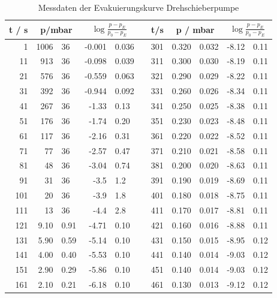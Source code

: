 \begin{table}[H]
\label{tab:10}
\centering
\caption{Messdaten der Evakuierungskurve Drehschieberpumpe}
\begin{tabular}{|r|r@{\,$\pm$\,}l|r@{\,$\pm$\,}l|p{0.5cm}|r|r@{\,$\pm$\,}l|r@{\,$\pm$\,}l|}
\hline
t / s & \multicolumn{2}{c|}{p/\unit{\milli\bar}} & \multicolumn{2}{c|}{$\log{\frac{p-p_E}{p_0-p_E}}$} & & t/s & \multicolumn{2}{c|}{p / \unit{\milli\bar}} & \multicolumn{2}{c|}{$\log{\frac{p-p_E}{p_0-p_E}}$} \\
\hline
1   & 1006   & 36    & -0.001 & 0.036 & & 301 & 0.320  & 0.032 & -8.12  & 0.11  \\
11  & 913    & 36    & -0.098 & 0.039 & & 311 & 0.300  & 0.030 & -8.19  & 0.11  \\
21  & 576    & 36    & -0.559 & 0.063 & & 321 & 0.290  & 0.029 & -8.22  & 0.11  \\
31  & 392    & 36    & -0.944 & 0.092 & & 331 & 0.260  & 0.026 & -8.34  & 0.11  \\
41  & 267    & 36    & -1.33  & 0.13  & & 341 & 0.250  & 0.025 & -8.38  & 0.11  \\
51  & 176    & 36    & -1.74  & 0.20  & & 351 & 0.230  & 0.023 & -8.48  & 0.11  \\
61  & 117    & 36    & -2.16  & 0.31  & & 361 & 0.220  & 0.022 & -8.52  & 0.11  \\
71  & 77     & 36    & -2.57  & 0.47  & & 371 & 0.210  & 0.021 & -8.58  & 0.11  \\
81  & 48     & 36    & -3.04  & 0.74  & & 381 & 0.200  & 0.020 & -8.63  & 0.11  \\
91  & 31     & 36    & -3.5   & 1.2   & & 391 & 0.190  & 0.019 & -8.69  & 0.11  \\
101 & 20     & 36    & -3.9   & 1.8   & & 401 & 0.180  & 0.018 & -8.75  & 0.11  \\
111 & 13     & 36    & -4.4   & 2.8   & & 411 & 0.170  & 0.017 & -8.81  & 0.11  \\
121 & 9.10   & 0.91  & -4.71  & 0.10  & & 421 & 0.160  & 0.016 & -8.88  & 0.11  \\
131 & 5.90   & 0.59  & -5.14  & 0.10  & & 431 & 0.150  & 0.015 & -8.95  & 0.12  \\
141 & 4.00   & 0.40  & -5.53  & 0.10  & & 441 & 0.140  & 0.014 & -9.03  & 0.12  \\
151 & 2.90   & 0.29  & -5.86  & 0.10  & & 451 & 0.140  & 0.014 & -9.03  & 0.12  \\
161 & 2.10   & 0.21  & -6.18  & 0.10  & & 461 & 0.130  & 0.013 & -9.12  & 0.12  \\

\end{tabular}
\end{table}
